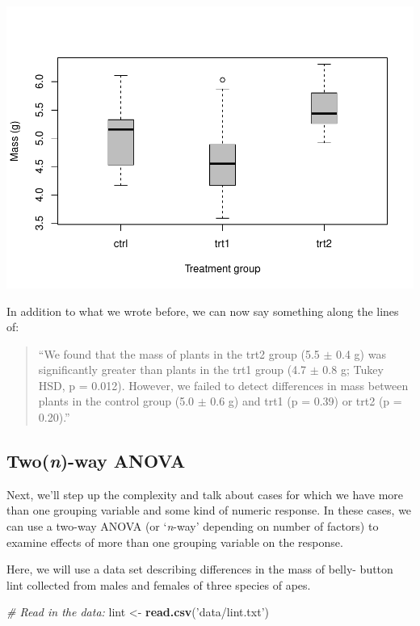 \documentclass[
]{book}
\newenvironment{Shaded}{\begin{snugshade}}{\end{snugshade}}
\newcommand{\CommentTok}[1]{\textcolor[rgb]{0.56,0.35,0.01}{\textit{#1}}}
\newcommand{\KeywordTok}[1]{\textcolor[rgb]{0.13,0.29,0.53}{\textbf{#1}}}
\newcommand{\NormalTok}[1]{#1}
\newcommand{\StringTok}[1]{\textcolor[rgb]{0.31,0.60,0.02}{#1}}
\begin{document}
\includegraphics{worstr_files/figure-latex/unnamed-chunk-194-1.pdf}

In addition to what we wrote before, we can now say something along the lines of:

\begin{quote}
``We found that the mass of plants in the trt2 group (5.5 \(\pm\) 0.4 g) was significantly greater than plants in the trt1 group (4.7 \(\pm\) 0.8 g; Tukey HSD, p = 0.012). However, we failed to detect differences in mass between plants in the control group (5.0 \(\pm\) 0.6 g) and trt1 (p = 0.39) or trt2 (p = 0.20).''
\end{quote}

\hypertarget{twon-way-anova}{%
\subsection{\texorpdfstring{Two(\emph{n})-way ANOVA}{Two(n)-way ANOVA}}\label{twon-way-anova}}

Next, we'll step up the complexity and talk about cases for which we have more than one grouping variable and some kind of numeric response. In these cases, we can use a two-way ANOVA (or `\emph{n}-way' depending on number of factors) to examine effects of more than one grouping variable on the response.

Here, we will use a data set describing differences in the mass of belly- button lint collected from males and females of three species of apes.

\begin{Shaded}
\begin{Highlighting}[]
\CommentTok{# Read in the data:}
\NormalTok{lint <-}\StringTok{ }\KeywordTok{read.csv}\NormalTok{(}\StringTok{'data/lint.txt'}\NormalTok{)}
\end{Highlighting}
\end{Shaded}
\end{document}
